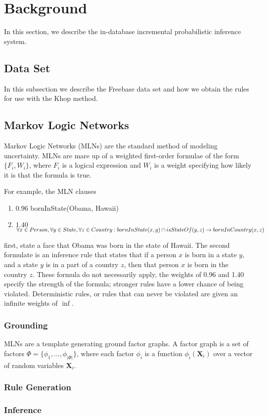 
\section{Background}

In this section, we describe the in-database incremental probabilistic inference system.

\subsection{Data Set}
In this subsection we describe the Freebase data set and how we obtain the rules for use with the Khop method.

\subsection{Markov Logic Networks}

Markov Logic Networks (MLNs) are the standard method of modeling uncertainty.
MLNs are mare up of a weighted first-order formulae of the form \(\{F_i, W_i\}\),
where \(F_i\) is a logical expression and \(W_i\) is a weight
specifying how likely it is that the formula is true.

For example, the MLN clauses 
\begin{enumerate}
  \item[] \(0.96\) bornInState(Obama, Hawaii)
  \item[] \(1.40\) \( \forall x \in Person, \forall y \in State, \forall z \in Country : \\
     bornInState(x,y) \cap isStateOf(y,z) \rightarrow bornInCountry(x, z)\)
\end{enumerate}
first, state a face that Obama was born in the state of Hawaii.
The second formulate is an inference rule that states that if a person \(x\) is born in a state \(y\), and a state \(y\) is in a part of a country \(z\),
then that person \(x\) is born in the country \(z\).
These formula do not necessarily apply,
the weights of 0.96 and 1.40 specify the strength of the formula; stronger rules have a lower chance of being violated.
Deterministic rules, or rules that can never be violated are given an infinite weights of $\inf$.


\subsubsection{Grounding}

MLNs are a template generating ground factor graphs.
A factor graph is a set of factors \(\Phi = \{ \phi_1, \ldots, \phi_{|\Phi|} \} \),
where each factor \(\phi_i\) is a function \(\phi_i (\mathbf{X}_i)\) over a
vector of random variables \(\mathbf{X}_i\).

\cite{chen2014knowledge}

\subsubsection{Rule Generation}



\subsubsection{Inference}



